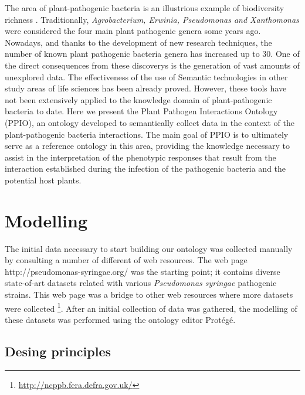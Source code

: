 \documentclass[sw]{iosart2c}
\newcommand{\myurl}[1]{\footnote{\url{#1}}}
\begin{document}
The area of plant-pathogenic bacteria is an illustrious example of biodiversity richness \cite{Bull2010}. Traditionally, {\itshape Agrobacterium, Erwinia, Pseudomonas and Xanthomonas} were considered the four main plant pathogenic genera some years ago. Nowadays, and thanks to the development of new research techniques, the number of known plant pathogenic bacteria genera has increased up to 30. One of the direct consequences from these discoverys is the generation of vast amounts of unexplored data. The effectiveness of the use of Semantic technologies in other study areas of life sciences has been already proved. However, these tools have not been extensively applied to the knowledge domain of plant-pathogenic bacteria to date. Here we present the Plant Pathogen Interactions Ontology (PPIO), an ontology developed to semantically collect data in the context of the plant-pathogenic bacteria interactions. The main goal of PPIO is to ultimately serve as a reference ontology in this area, providing the knowledge necessary to assist in the interpretation of the phenotypic responses that result from the interaction established during the infection of the pathogenic bacteria and the potential host plants.




\section{Modelling}

The initial data necessary to start building our ontology was collected manually by consulting a number of different of web resources. The web page http://pseudomonas-syringae.org/ was the starting point; it contains diverse state-of-art datasets related with various {\itshape Pseudomonas syringae} pathogenic strains. This web page was a bridge to other web resources where more datasets were collected \myurl{http://ncppb.fera.defra.gov.uk/}. After an initial collection of data was gathered, the modelling of these datasets was performed using the ontology editor Prot\'eg\'e.

\subsection{Desing principles}
\end{document}
